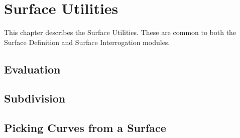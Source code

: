 \chapter{Surface Utilities}
\label{surfaceutilities}
This chapter describes the Surface Utilities. These are common to both
the Surface Definition and Surface Interrogation modules.


\pgsbreak
\section{Evaluation}

\pgsbreak

\pgsbreak

\pgsbreak

\pgsbreak

\pgsbreak
\section{Subdivision}

\pgsbreak

\pgsbreak
\section{Picking Curves from a Surface}

\pgsbreak

\pgsbreak

\pgsbreak

